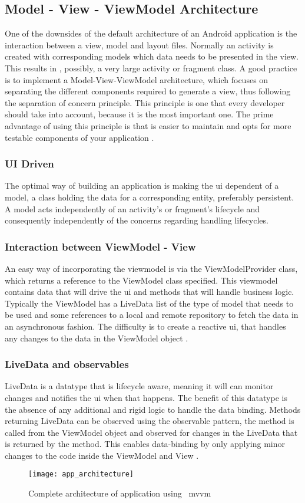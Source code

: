\subsection{Model - View - ViewModel Architecture}
One of the downsides of the default architecture of an Android application is the interaction between a view, model and layout files. Normally an activity is created with corresponding models which data needs to be presented in the view. This results in , possibly, a very large activity or fragment class. A good practice is to implement a Model-View-ViewModel architecture, which focuses on separating the different components required to generate a view, thus following the separation of concern principle. This principle is one that every developer should take into account, because it is the most important one. The prime advantage of using this principle is that is easier to maintain and opts for more testable components of your application \cite{AndroidDevelopers2019b}.
\subsubsection{UI Driven}
The optimal way of building an application is making the \acrshort{ui} dependent of a model, a class holding the data for a corresponding entity, preferably persistent. A model acts independently of an activity's or fragment's lifecycle and consequently independently of the concerns regarding handling lifecycles.
\subsubsection{Interaction between ViewModel - View}
An easy way of incorporating the viewmodel is via the ViewModelProvider class, which returns a reference to the ViewModel class specified. This viewmodel contains data that will drive the \acrshort{ui} and methods that will handle business logic. Typically the ViewModel has a LiveData list of the type of model that needs to be used and some references to a local and remote repository to fetch the data in an asynchronous fashion. The difficulty is to create a reactive \acrshort{ui}, that handles any changes to the data in the ViewModel object \cite{JaewoongEum2018}.
\subsubsection{LiveData and observables}
LiveData is a datatype that is lifecycle aware, meaning it will can monitor changes and notifies the \acrshort{ui} when that happens. The benefit of this datatype is the absence of any additional and rigid logic to handle the data binding. Methods returning LiveData can be observed using the observable pattern, the method is called from the ViewModel object and observed for changes in the LiveData that is returned by the method. This enables data-binding by only applying minor changes to the code inside the ViewModel and View \cite{AndroidDevelopers2019b}.
\begin{figure}[h!]
\texttt{[image: app\_architecture]}
\centering
\caption{Complete architecture of application using ~\acrshort{mvvm}~\cite{AndroidDevelopers2019b}}
\end{figure}